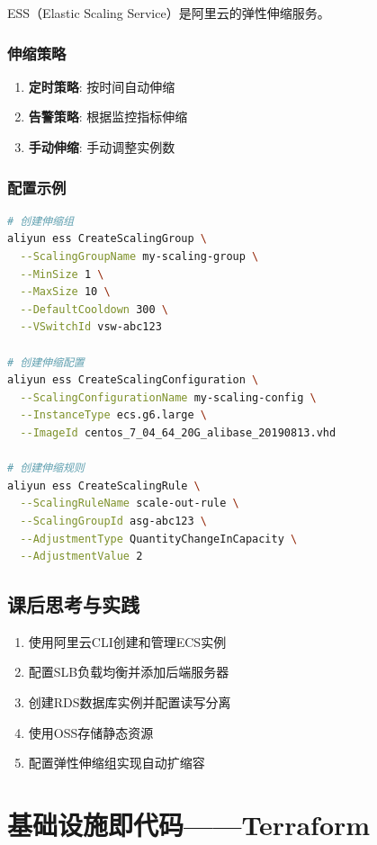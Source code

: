 \documentclass[12pt,UTF8]{ctexbook}
\begin{document}
ESS（Elastic Scaling Service）是阿里云的弹性伸缩服务。

\subsection{伸缩策略}

\begin{enumerate}
    \item \textbf{定时策略}: 按时间自动伸缩
    \item \textbf{告警策略}: 根据监控指标伸缩
    \item \textbf{手动伸缩}: 手动调整实例数
\end{enumerate}

\subsection{配置示例}

\begin{lstlisting}[language=bash]
# 创建伸缩组
aliyun ess CreateScalingGroup \
  --ScalingGroupName my-scaling-group \
  --MinSize 1 \
  --MaxSize 10 \
  --DefaultCooldown 300 \
  --VSwitchId vsw-abc123

# 创建伸缩配置
aliyun ess CreateScalingConfiguration \
  --ScalingConfigurationName my-scaling-config \
  --InstanceType ecs.g6.large \
  --ImageId centos_7_04_64_20G_alibase_20190813.vhd

# 创建伸缩规则
aliyun ess CreateScalingRule \
  --ScalingRuleName scale-out-rule \
  --ScalingGroupId asg-abc123 \
  --AdjustmentType QuantityChangeInCapacity \
  --AdjustmentValue 2
\end{lstlisting}

\section{课后思考与实践}
\label{sec:cloud-platforms-practice}
\begin{enumerate}
    \item 使用阿里云CLI创建和管理ECS实例
    \item 配置SLB负载均衡并添加后端服务器
    \item 创建RDS数据库实例并配置读写分离
    \item 使用OSS存储静态资源
    \item 配置弹性伸缩组实现自动扩缩容
\end{enumerate}

\chapter{基础设施即代码——Terraform}
\label{chap:terraform}
\end{document}
